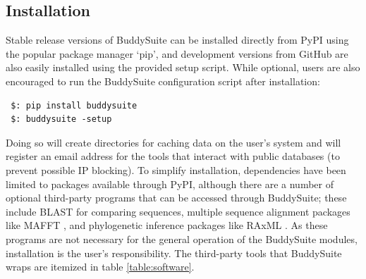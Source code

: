 \documentclass[nogrid]{MBE_article}%
\begin{document}
\subsection{Installation}
Stable release versions of BuddySuite can be installed directly from PyPI using the popular package manager `pip', and development versions from GitHub are also easily installed using the provided setup script. While optional, users are also encouraged to run the BuddySuite configuration script after installation:

\smallskip
{\small
\begin{verbatim}
 $: pip install buddysuite
 $: buddysuite -setup
\end{verbatim}
}
\smallskip

Doing so will create directories for caching data on the user's system and will register an email address for the tools that interact with public databases (to prevent possible IP blocking). To simplify installation, dependencies have been limited to packages available through PyPI, although there are a number of optional third-party programs that can be accessed through BuddySuite; these include BLAST \cite{Camacho2009} for comparing sequences, multiple sequence alignment packages like MAFFT \cite{Katoh:2013hm}, and phylogenetic inference packages like RAxML \cite{Stamatakis:2006de}. As these programs are not necessary for the general operation of the BuddySuite modules, installation is the user's responsibility. The third-party tools that BuddySuite wraps are itemized in table \ref{table:software}.
\end{document}
